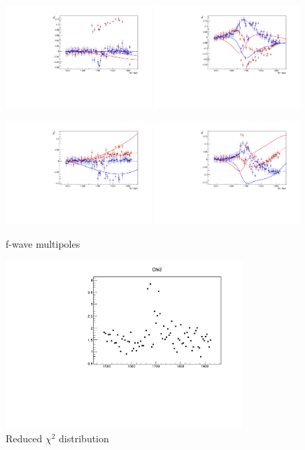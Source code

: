 \documentclass[a4paper,12pt]{report}
\begin{document}
\begin{figure}
  \begin{center}
    \centerline{
    \includegraphics[width=0.49\textwidth]{plots.0/E3p.pdf}
    \includegraphics[width=0.49\textwidth]{plots.0/E3m.pdf}
    }
    \centerline{
    \includegraphics[width=0.49\textwidth]{plots.0/M3p.pdf}
    \includegraphics[width=0.49\textwidth]{plots.0/M3m.pdf}
    }
    \caption{f-wave multipoles}
  \end{center}
\end{figure}

\begin{figure}
  \begin{center}
    \centerline{
    \includegraphics[width=0.8\textwidth]{plots.0/Chi2.pdf}
    }
    \caption{Reduced $\chi^2$ distribution }
  \end{center}
\end{figure}
\end{document}
